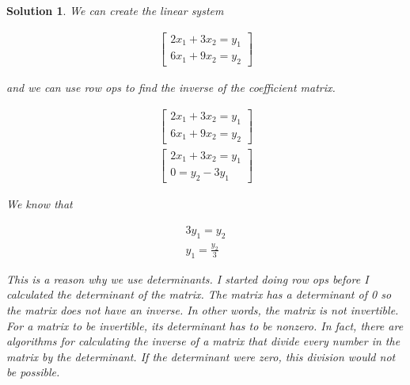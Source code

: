 \documentclass{article}
\newtheorem*{solution}{Solution}
\begin{document}
\begin{solution}
We can create the linear system

\begin{align*}
\begin{bmatrix}
2x_{1} + 3x_{2} = y_{1} \\
6x_{1} + 9x_{2} = y_{2}
\end{bmatrix}
\end{align*}

and we can use row ops to find the inverse of the coefficient matrix.

\begin{align*}
\begin{bmatrix}
2x_{1} + 3x_{2} = y_{1} \\
6x_{1} + 9x_{2} = y_{2}
\end{bmatrix} \\
\begin{bmatrix}
2x_{1} + 3x_{2} = y_{1} \\
0 = y_{2} - 3y_{1}
\end{bmatrix} 
\end{align*}

We know that

\begin{align*}
3y_{1} = y_{2} \\
y_{1} = \frac{y_{2}}{3}
\end{align*}

This is a reason why we use determinants. I started doing row ops before I calculated the determinant of the matrix. The matrix has a determinant of 0 so the matrix does not have an inverse. In other words, the matrix is not invertible. For a matrix to be invertible, its determinant has to be nonzero. In fact, there are algorithms for calculating the inverse of a matrix that divide every number in the matrix by the determinant. If the determinant were zero, this division would not be possible. 

\end{solution}
\end{document}
